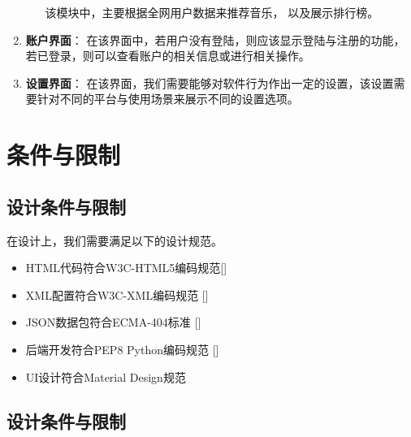 \begin{enumerate}
\begin{itemize}
                该模块中，主要根据全网用户数据来推荐音乐，
                以及展示排行榜。
        \end{itemize}
    \item \textbf{账户界面}：
        在该界面中，若用户没有登陆，则应该显示登陆与注册的功能，
        若已登录，则可以查看账户的相关信息或进行相关操作。
    \item \textbf{设置界面}：
        在该界面，我们需要能够对软件行为作出一定的设置，该设置需要针对不同的平台与使用场景来展示不同的设置选项。
\end{enumerate}
\newpage

\section{条件与限制}

\subsection{设计条件与限制} %

在设计上，我们需要满足以下的设计规范。

        \begin{itemize}
            \item HTML代码符合W3C-HTML5编码规范[\cite{hickson2011html5}]
            \item XML配置符合W3C-XML编码规范 [\cite{bray1997extensible}]
            \item JSON数据包符合ECMA-404标准 [\cite{bray2017javascript}]
            \item 后端开发符合PEP8 Python编码规范 [\cite{van2001pep}]
            \item UI设计符合Material Design规范
        \end{itemize}

\subsection{设计条件与限制} %

